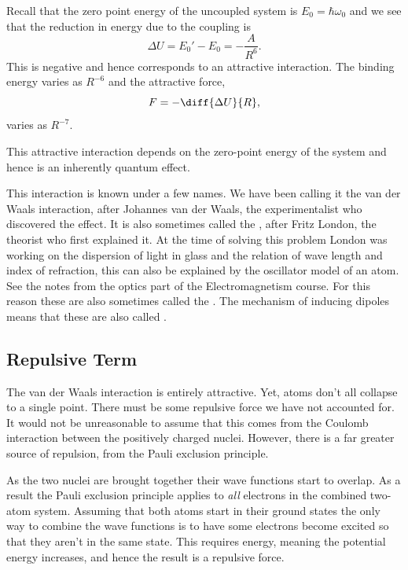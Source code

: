 \documentclass[fleqn]{NotesClass}
\begin{document}
    Recall that the zero point energy of the uncoupled system is \(E_0 = \hbar\omega_0\) and we see that the reduction in energy due to the coupling is
    \begin{equation}
        \Delta U = E_0' - E_0 = -\frac{A}{R^6}.
    \end{equation}
    This is negative and hence corresponds to an attractive interaction.
    The binding energy varies as \(R^{-6}\) and the attractive force,
    \begin{equation}
        F = -\diff{\Delta U}{R},
    \end{equation}
    varies as \(R^{-7}\).
    
    This attractive interaction depends on the zero-point energy of the system and hence is an inherently quantum effect.
    
    This interaction is known under a few names.
    We have been calling it the van der Waals interaction, after Johannes van der Waals, the experimentalist who discovered the effect.
    It is also sometimes called the , after Fritz London, the theorist who first explained it.
    At the time of solving this problem London was working on the dispersion of light in glass and the relation of wave length and index of refraction, this can also be explained by the oscillator model of an atom.
    See the notes from the optics part of the Electromagnetism course.
    For this reason these are also sometimes called the .
    The mechanism of inducing dipoles means that these are also called .
    
    \subsection{Repulsive Term}
    The van der Waals interaction is entirely attractive.
    Yet, atoms don't all collapse to a single point.
    There must be some repulsive force we have not accounted for.
    It would not be unreasonable to assume that this comes from the Coulomb interaction between the positively charged nuclei.
    However, there is a far greater source of repulsion, from the Pauli exclusion principle.
    
    As the two nuclei are brought together their wave functions start to overlap.
    As a result the Pauli exclusion principle applies to \emph{all} electrons in the combined two-atom system.
    Assuming that both atoms start in their ground states the only way to combine the wave functions is to have some electrons become excited so that they aren't in the same state.
    This requires energy, meaning the potential energy increases, and hence the result is a repulsive force.
    
\end{document}
